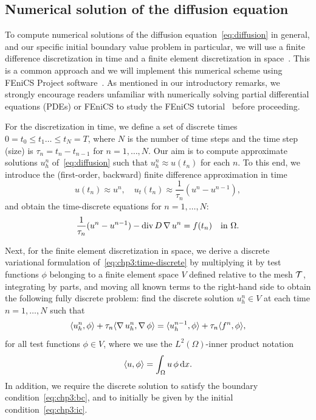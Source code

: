 \subsection{Numerical solution of the diffusion equation}
\label{sec:chp3:model-problem-numerical-formulation}

%
%
To compute numerical solutions of the diffusion
equation~\eqref{eq:diffusion} in general, and our specific initial
boundary value problem in particular, we will use a finite difference
discretization in time and a finite element discretization in
space~\cite{langtangen2019introduction,
  gockenbach2006understanding}. This is a common approach and we will
implement this numerical scheme using FEniCS Project
software~\cite{logg2012automated,alnaes2015fenics,langtangen2016solving}. As
mentioned in our introductory remarks, we strongly encourage readers
unfamiliar with numerically solving partial differential equations
(PDEs) or FEniCS to study the FEniCS
tutorial~\cite{langtangen2016solving} before proceeding.

For the discretization in time, we define a set of discrete times $0 =
t_0 \leq t_1 \dots \leq t_N = T$, where $N$ is the number of time
steps and the time step (size) is $\tau_n = t_n - t_{n-1}$ for $n = 1,
\dots, N$. Our aim is to compute approximate solutions $u^n_h$
of~\eqref{eq:diffusion} such that $u^n_h \approx u(t_n)$ for each
$n$. To this end, we introduce the (first-order, backward) finite
difference approximation in time
\begin{equation}
  u(t_n) \approx u^n, \quad
  u_t(t_n) \approx \frac{1}{\tau_n} (u^n - u^{n-1}),
\end{equation}
and obtain the time-discrete equations for $n = 1, \dots, N$:
\begin{equation}
  \label{eq:chp3:time-discrete}
  \frac{1}{\tau_n} (u^n - u^{n-1}) - \operatorname{\mathrm{div}} D \operatorname{\nabla} u^n = f(t_n) \quad \text{in } \Omega. 
\end{equation}

Next, for the finite element discretization in space, we derive a
discrete variational formulation of~\eqref{eq:chp3:time-discrete} by
multiplying it by test functions $\phi$ belonging to a finite element space $V$
defined relative to the mesh $\mathcal{T}$, integrating by parts, and moving
all known terms to the right-hand side to obtain the following fully
discrete problem: find the discrete solution $u_h^n \in V$ at each
time $n = 1, \dots, N$ such that
\begin{equation}
  \label{eq:chp3:discrete}
  \langle u_h^n,\phi\rangle + \tau_n \langle \operatorname{\nabla} u_h^n,\operatorname{\nabla} \phi\rangle
  =  \langle u_h^{n-1},\phi\rangle + \tau_n \langle f^n,\phi\rangle,  
\end{equation}
for all test functions $\phi \in V$, where we use the
$L^2(\Omega)$-inner product notation
\begin{equation}
  \langle u,\phi\rangle = \int_{\Omega} u \, \phi \, \mathrm{d}x.
\end{equation}
In addition, we require the discrete solution to satisfy the
boundary condition~\eqref{eq:chp3:bc}, and to initially be given by the
initial condition~\eqref{eq:chp3:ic}.   

